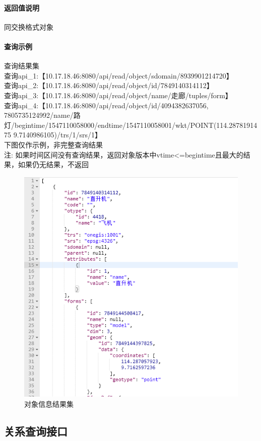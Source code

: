 \documentclass[UTF8, 12pt]{ctexart}
\begin{document}
	\paragraph{返回值说明}
		同交换格式对象
	\paragraph{查询示例}
		查询结果集 \\
		查询api\_1:【10.17.18.46:8080/api/read/object/sdomain/8939901214720】 \\
		查询api\_2:【10.17.18.46:8080/api/read/object/id/7849140314112】 \\
		查询api\_3:【10.17.18.46:8080/api/read/object/name/走廊/tuples/form】 \\
		查询api\_4:【10.17.18.46:8080/api/read/object/id/4094382637056, 7805735124992/name/路灯/begintime/1547110058000/endtime/1547110058001/wkt/POINT(114.2878191475 9.7140986105)/trs/1/srs/1】 \\
		下图仅作示例，非完整查询结果 \\
		{\color{red}注: 如果时间区间没有查询结果，返回对象版本中vtime<=begintime且最大的结果，如果仍无结果，不返回}
		\begin{figure}[H]
			\centering
			\includegraphics[width = 0.7\linewidth]{object.png}
			\caption{对象信息结果集}
			\label{Fig:1}
			\vspace{-0.5cm}
		\end{figure}

\subsection{关系查询接口}
\end{document}
